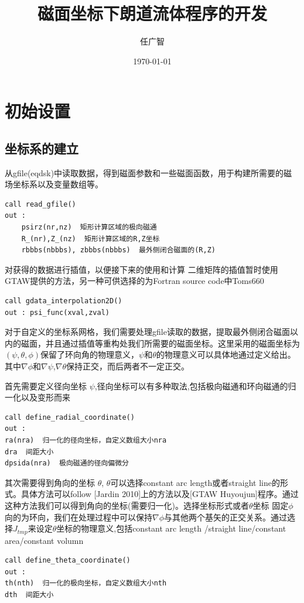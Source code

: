 \documentclass[11pt,a4paper]{article}
\title{磁面坐标下朗道流体程序的开发}
\author{任广智}
\date{\today}
\begin{document}
	
\maketitle
	
\section{初始设置}	
\subsection{坐标系的建立} 
从gfile(eqdsk)中读取数据，得到磁面参数和一些磁面函数，用于构建所需要的磁场坐标系以及变量数组等。

\begin{lstlisting}
call read_gfile()
out :
	psirz(nr,nz)  矩形计算区域的极向磁通
	R_(nr),Z_(nz)  矩形计算区域的R,Z坐标
	rbbbs(nbbbs), zbbbs(nbbbs)  最外侧闭合磁面的(R,Z)
\end{lstlisting}

对获得的数据进行插值，以便接下来的使用和计算
二维矩阵的插值暂时使用GTAW提供的方法，另一种可供选择的为Fortran source code中Toms660
\begin{lstlisting}
call gdata_interpolation2D()
out : psi_func(xval,zval)
\end{lstlisting}

对于自定义的坐标系网格，我们需要处理gfile读取的数据，提取最外侧闭合磁面以内的磁面，并且通过插值等重构处我们所需要的磁面坐标。这里采用的磁面坐标为$(\psi,\theta,\phi)$保留了环向角的物理意义，$\psi$和$\theta$的物理意义可以具体地通过定义给出。其中$\nabla\phi$和$\nabla\psi$,$\nabla\theta$保持正交，而后两者不一定正交。

首先需要定义径向坐标 $\psi$,径向坐标可以有多种取法,包括极向磁通和环向磁通的归一化以及变形而来
\begin{lstlisting}
call define_radial_coordinate()
out :
ra(nra)  归一化的径向坐标，自定义数组大小nra
dra  间距大小
dpsida(nra)  极向磁通的径向偏微分 
\end{lstlisting}

其次需要得到角向的坐标 $\theta$, $\theta$可以选择constant arc length或者straight line的形式。具体方法可以follow [Jardin 2010]上的方法以及[GTAW Huyoujun]程序。通过这种方法我们可以得到角向的坐标(需要归一化)。选择坐标形式或者$\theta$坐标
固定$\phi$向的为环向，我们在处理过程中可以保持$\nabla\phi$与其他两个基矢的正交关系。通过选择$J_{tmp}$来设定$\theta$坐标的物理意义,包括constant arc length
/straight line/constant area/constant volumn
\begin{lstlisting}
call define_theta_coordinate()
out :
th(nth)  归一化的极向坐标，自定义数组大小nth
dth  间距大小 
\end{lstlisting}
\end{document}
